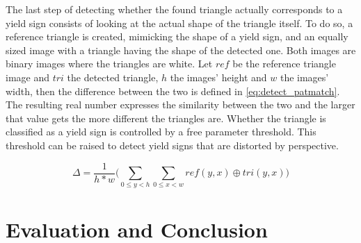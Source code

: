 \documentclass{report}
\begin{document}
The last step of detecting whether the found triangle actually
corresponds to a yield sign consists of looking at the actual shape of
the triangle itself. To do so, a reference triangle is created,
mimicking the shape of a yield sign, and an equally sized image with a
triangle having the shape of the detected one. Both images are binary
images where the triangles are white. Let \( ref \) be the reference
triangle image and \( tri \) the detected triangle, \( h \) the
images' height and \( w \) the images' width, then the difference
between the two is defined in \ref{eq:detect_patmatch}. The resulting
real number expresses the similarity between the two and the larger
that value gets the more different the triangles are. Whether the
triangle is classified as a yield sign is controlled by a free
parameter threshold. This threshold can be raised to detect yield
signs that are distorted by perspective.

\begin{equation}\label{eq:detect_patmatch}
  \Delta = \frac{1}{h * w} \Bigg( \sum_{0 \leq y < h}\sum_{0 \leq x <w} ref(y, x) \oplus tri(y, x) \Bigg)
\end{equation}


\pagebreak
\chapter{Evaluation and Conclusion}
{\color{red}{To be written}}
\end{document}
